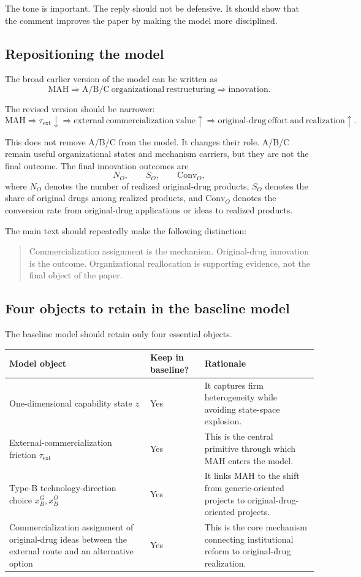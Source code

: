 \documentclass[12pt]{article}
\newcommand{\tauext}{\tau_{\mathrm{ext}}}
\newcommand{\Conv}{\mathrm{Conv}}
\begin{document}
The tone is important. The reply should not be defensive. It should show that the comment improves the paper by making the model more disciplined.

\subsection{Repositioning the model}

The broad earlier version of the model can be written as
\[
\mathrm{MAH}\Rightarrow \mathrm{A/B/C\ organizational\ restructuring}\Rightarrow \mathrm{innovation}.
\]

The revised version should be narrower:
\[
\mathrm{MAH}\Rightarrow \tauext \downarrow
\Rightarrow \mathrm{external\ commercialization\ value}\uparrow
\Rightarrow \mathrm{original\text{-}drug\ effort\ and\ realization}\uparrow.
\]

This does not remove A/B/C from the model. It changes their role. A/B/C remain useful organizational states and mechanism carriers, but they are not the final outcome. The final innovation outcomes are
\[
N_O,\qquad S_O,\qquad \Conv_O,
\]
where $N_O$ denotes the number of realized original-drug products, $S_O$ denotes the share of original drugs among realized products, and $\Conv_O$ denotes the conversion rate from original-drug applications or ideas to realized products.

The main text should repeatedly make the following distinction:
\begin{quote}
Commercialization assignment is the mechanism. Original-drug innovation is the outcome. Organizational reallocation is supporting evidence, not the final object of the paper.
\end{quote}

\subsection{Four objects to retain in the baseline model}

The baseline model should retain only four essential objects.

\begin{longtable}{p{}p{}p{}}
\toprule
Model object & Keep in baseline? & Rationale \\
\midrule
One-dimensional capability state $z$ & Yes & It captures firm heterogeneity while avoiding state-space explosion. \\
\addlinespace
External-commercialization friction $\tauext$ & Yes & This is the central primitive through which MAH enters the model. \\
\addlinespace
Type-B technology-direction choice $x_B^G,x_B^O$ & Yes & It links MAH to the shift from generic-oriented projects to original-drug-oriented projects. \\
\addlinespace
Commercialization assignment of original-drug ideas between the external route and an alternative option & Yes & This is the core mechanism connecting institutional reform to original-drug realization. \\
\bottomrule
\end{longtable}
\end{document}
